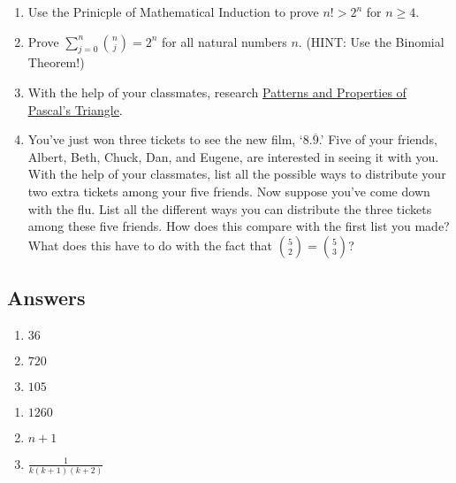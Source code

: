 \begin{enumerate}
\setcounter{enumi}{\value{HW}}

\item  Use the Prinicple of Mathematical Induction to prove $n! > 2^{n}$ for $n \geq	4$.

\item  Prove $\displaystyle{\sum_{j=0}^{n} \binom{n}{j} = 2^{n}}$ for all natural numbers $n$.  (HINT:  Use the Binomial Theorem!)

\item  With the help of your classmates, research \href{http://en.wikipedia.org/wiki/Pascal's_triangle#Patterns_and_properties}{\underline{Patterns and Properties of Pascal's Triangle}}.  

\item  You've just won three tickets to see the new film, `$8.\overline{9}$.'  Five of your friends, Albert, Beth, Chuck, Dan, and Eugene, are interested in seeing it with you.  With the help of your classmates, list all the possible ways to distribute your two extra tickets among your five friends.  Now suppose you've come down with the flu.  List all the different ways you can distribute the three tickets among these five friends.  How does this compare with the first list you made?  What does this have to do with the fact that $\binom{5}{2} = \binom{5}{3}$? 

\setcounter{HW}{\value{enumi}}
\end{enumerate}

\newpage

\subsection{Answers}



\begin{multicols}{3}
\begin{enumerate}

\item  $36$

\item  $720$

\item  $105$

\setcounter{HW}{\value{enumi}}
\end{enumerate}
\end{multicols}

\begin{multicols}{3}
\begin{enumerate}
\setcounter{enumi}{\value{HW}}

\item  $1260$

\item  $n+1$

\item  $\frac{1}{k(k+1)(k+2)}$

\setcounter{HW}{\value{enumi}}
\end{enumerate}
\end{multicols}

